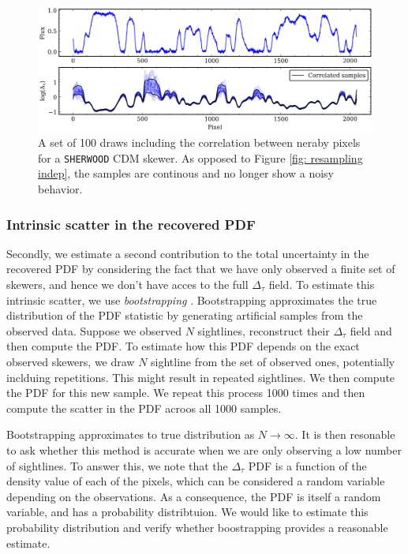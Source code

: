 \begin{figure}
    \centering
    \includegraphics[width=0.85\linewidth]{img/ML/ml_resample_corr.png}
    \caption{A set of 100 draws including the correlation between neraby pixels for a \texttt{SHERWOOD} CDM skewer. As opposed to Figure \ref{fig: resampling indep}, the samples are continous and no longer show a noisy behavior.}
    \label{fig: resampling corr}
\end{figure}

\subsubsection{Intrinsic scatter in the recovered PDF}
Secondly, we estimate a second contribution to the total uncertainty in the recovered PDF by considering the fact that we have only observed a finite set of skewers, and hence we don't have acces to the full $\Delta_\tau$ field. To estimate this intrinsic scatter, we use \emph{bootstrapping} \cite{Kreiss2011}. Bootstrapping approximates the true distribution of the PDF statistic by generating artificial samples from the observed data. Suppose we observed $N$ sightlines, reconstruct their $\Delta_\tau$ field and then compute the PDF. To estimate how this PDF depends on the exact observed skewers, we draw $N$ sightline from the set of observed ones, potentially inclduing repetitions. This might result in repeated sightlines. We then compute the PDF for this new sample. We repeat this process 1000 times and then compute the scatter in the PDF acroos all 1000 samples. 

Bootstrapping approximates to true distribution as $N\to \infty$. It is then resonable to ask whether this method is accurate when we are only observing a low number of sightlines. To answer this, we note that the $\Delta_\tau$ PDF is a function of the density value of each of the pixels, which can be considered a random variable depending on the observations. As a consequence, the PDF is itself a random variable, and has a probability distribtuion. We would like to estimate this probability distribution and verify whether boostrapping provides a reasonable estimate.

